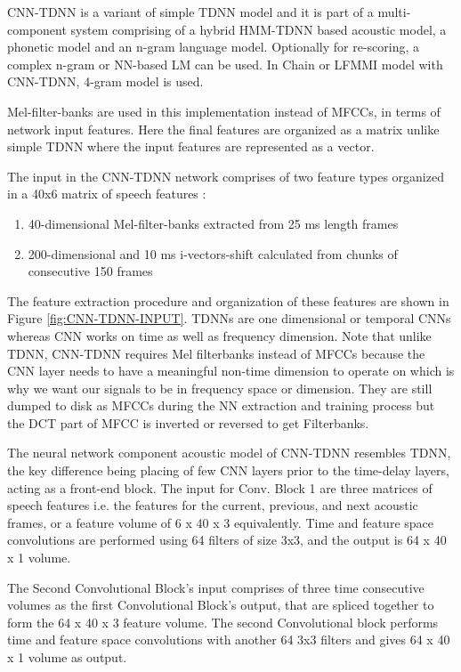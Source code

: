 CNN-TDNN is a variant of simple TDNN model and it is part of a multi-component system comprising of a hybrid HMM-TDNN based acoustic model, a phonetic model and an n-gram language model. Optionally for re-scoring, a complex n-gram or NN-based LM can be used. In Chain or LFMMI model with CNN-TDNN, 4-gram model is used. 

Mel-filter-banks are used in this implementation instead of MFCCs, in terms of network input features. Here the final features are organized as a matrix unlike simple TDNN where the input features are represented as a vector. 

The input in the CNN-TDNN network comprises of two feature types organized in a 40x6 matrix of speech features \cite{georgescu_performance_2021}: 

\begin{enumerate}
    \item 40-dimensional Mel-filter-banks extracted from 25 ms length frames
    \item 200-dimensional and 10 ms i-vectors-shift calculated from chunks of consecutive 150 frames
\end{enumerate}

The feature extraction procedure and organization of these features are shown in Figure \ref{fig:CNN-TDNN-INPUT}. TDNNs are one dimensional or temporal CNNs whereas CNN works on time as well as frequency dimension. Note that unlike TDNN, CNN-TDNN requires Mel filterbanks instead of MFCCs because the CNN layer needs to have a meaningful non-time dimension to operate on which is why we want our signals to be in  frequency space or dimension. They are still dumped to disk as MFCCs during the NN extraction and training process but the DCT part of MFCC is inverted or reversed to get Filterbanks. 

The neural network component acoustic model of CNN-TDNN resembles TDNN, the key difference being placing of few CNN layers prior to the time-delay layers, acting as a front-end block. The input for Conv. Block 1 are three matrices of speech features i.e. the features for the current, previous, and next acoustic frames, or a feature volume of 6 x 40 x 3 equivalently. Time and feature space convolutions are performed using 64 filters of size 3x3, and the output is 64 x 40 x 1 volume. %

The Second Convolutional Block's input comprises of three time consecutive volumes as the first Convolutional Block's output, that are spliced together to form the 64 x 40 x 3 feature volume. The second Convolutional block performs time and feature space convolutions with another 64 3x3 filters and gives 64 x 40 x 1 volume as output. 

